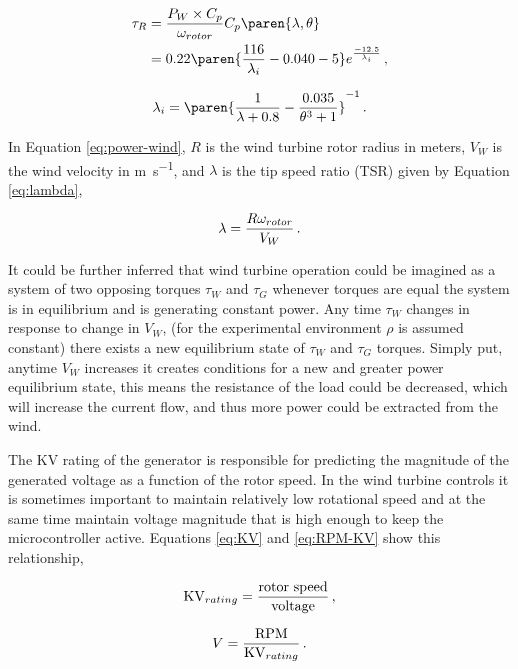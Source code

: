 \documentclass[../ewet_cwc_report.tex]{subfiles}
\begin{document}
\begin{alignat}{3}
  \tau_R & = \frac{P_W \times C_p}{\omega_{rotor}}
  C_p\paren{\lambda, \theta}                               \\
         & = 0.22\paren{\frac{116}{\lambda_i} - 0.040 - 5}
  e^\frac{-12.5}{\lambda_i}
  \text{\,,}
  \label{eq:tau-r}
\end{alignat}

\begin{equation}
  \lambda_i = \paren{\frac{1}{\lambda + 0.8} -
    \frac{0.035}{\theta^3 + 1}}^{-1}
  \text{\,.}
  \label{eq:lambda-i}
\end{equation}

In Equation \eqref{eq:power-wind}, $R$ is the wind turbine
rotor radius in meters, $V_W$ is the wind velocity in
\unit{\meter\per\s}, and $\lambda$ is the tip speed ratio (TSR)
given by Equation \eqref{eq:lambda},

\begin{equation}
  \lambda = \frac{R \omega_{rotor}}{V_W}
  \text{\,.}
  \label{eq:lambda}
\end{equation}

It could be further inferred that wind turbine operation could
be imagined as a system of two opposing torques $\tau_W$ and
$\tau_G$ whenever torques are equal the system is in
equilibrium and is generating constant power. Any time
$\tau_W$ changes in response to change in $V_W$, (for the
experimental environment $\rho$ is assumed constant) there
exists a new equilibrium state of $\tau_W$ and $\tau_G$
torques. Simply put, anytime $V_W$ increases it creates
conditions for a new and greater power equilibrium state, this
means the resistance of the load could be decreased, which will
increase the current flow, and thus more power could be
extracted from the wind.

The KV rating of the generator is responsible for predicting
the magnitude of the generated voltage as a function of the
rotor speed. In the wind turbine controls it is sometimes
important to maintain relatively low rotational speed and at
the same time maintain voltage magnitude that is high enough to
keep the microcontroller active. Equations \eqref{eq:KV} and
\eqref{eq:RPM-KV} show this relationship,

\begin{equation}
  \text{KV}_{rating} = \frac{\text{rotor speed}}{\text{voltage}}
  \text{\,,}
  \label{eq:KV}
\end{equation}

\begin{equation}
  V = \frac{\text{RPM}}{\text{KV}_{rating}}
  \text{\,.}
  \label{eq:RPM-KV}
\end{equation}
\end{document}
